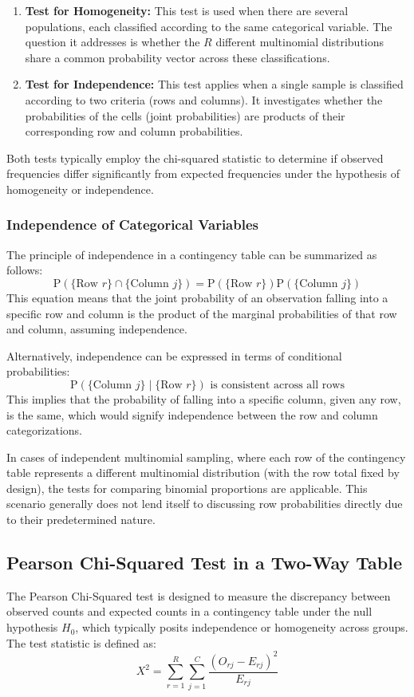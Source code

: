 \documentclass{article}
\begin{document}
\begin{enumerate}
    \item \textbf{Test for Homogeneity:} This test is used when there are several populations, each classified according to the same categorical variable. The question it addresses is whether the $R$ different multinomial distributions share a common probability vector across these classifications.
    
    \item \textbf{Test for Independence:} This test applies when a single sample is classified according to two criteria (rows and columns). It investigates whether the probabilities of the cells (joint probabilities) are products of their corresponding row and column probabilities.
\end{enumerate}

Both tests typically employ the chi-squared statistic to determine if observed frequencies differ significantly from expected frequencies under the hypothesis of homogeneity or independence.

\subsubsection{Independence of Categorical Variables}
The principle of independence in a contingency table can be summarized as follows:
\[
\mathrm{P}(\{\text{Row } r\} \cap \{\text{Column } j\}) = \mathrm{P}(\{\text{Row } r\}) \mathrm{P}(\{\text{Column } j\})
\]
This equation means that the joint probability of an observation falling into a specific row and column is the product of the marginal probabilities of that row and column, assuming independence.

Alternatively, independence can be expressed in terms of conditional probabilities:
\[
\mathrm{P}(\{\text{Column } j\} \mid \{\text{Row } r\}) \text{ is consistent across all rows}
\]
This implies that the probability of falling into a specific column, given any row, is the same, which would signify independence between the row and column categorizations.

In cases of independent multinomial sampling, where each row of the contingency table represents a different multinomial distribution (with the row total fixed by design), the tests for comparing binomial proportions are applicable. This scenario generally does not lend itself to discussing row probabilities directly due to their predetermined nature.

\subsection{Pearson Chi-Squared Test in a Two-Way Table}
The Pearson Chi-Squared test is designed to measure the discrepancy between observed counts and expected counts in a contingency table under the null hypothesis $H_0$, which typically posits independence or homogeneity across groups. The test statistic is defined as:
\[
X^{2}=\sum_{r=1}^{R} \sum_{j=1}^{C} \frac{(O_{r j}-E_{r j})^2}{E_{r j}}
\]
\end{document}
